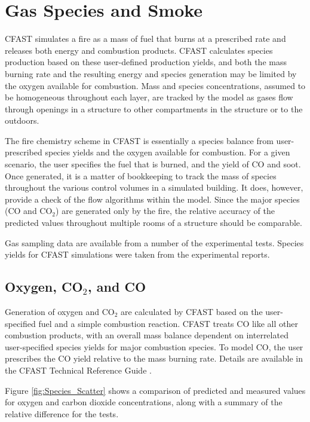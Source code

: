 \chapter{Gas Species and Smoke}

CFAST simulates a fire as a mass of fuel that burns at a prescribed rate and releases both energy and combustion products.  CFAST calculates species production based on these user-defined production yields, and both the mass burning rate and the resulting energy and species generation may be limited by the oxygen available for combustion.  Mass and species concentrations, assumed to be homogeneous throughout each layer, are tracked by the model as gases flow through openings in a structure to other compartments in the structure or to the outdoors.

The fire chemistry scheme in CFAST is essentially a species balance from user-prescribed species yields and the oxygen available for combustion.  For a given scenario, the user specifies the fuel that is burned, and the yield of CO and soot. Once generated, it is a matter of bookkeeping to track the mass of species throughout the various control volumes in a simulated building.  It does, however, provide a check of the flow algorithms within the model. Since the major species (CO and CO$_2$) are generated only by the fire, the relative accuracy of the predicted values throughout multiple rooms of a structure should be comparable.

Gas sampling data are available from a number of the experimental tests. Species yields for CFAST simulations were taken from the experimental reports.

\section{Oxygen, CO$_2$, and CO}

Generation of oxygen and CO$_2$ are calculated by CFAST based on the user-specified fuel and a simple combustion reaction. CFAST treats CO like all other combustion products, with an overall mass balance dependent on interrelated user-specified species yields for major combustion species. To model CO, the user prescribes the CO yield relative to the mass burning rate. Details are available in the CFAST Technical Reference Guide \cite{CFAST_Tech_Guide_7}.

Figure \ref{fig:Species_Scatter} shows a comparison of predicted and measured values for oxygen and carbon dioxide concentrations, along with a summary of the relative difference for the tests.
\label{Oxygen Concentration}
\label{Carbon Dioxide Concentration}
\label{Carbon Monoxide Concentration}

